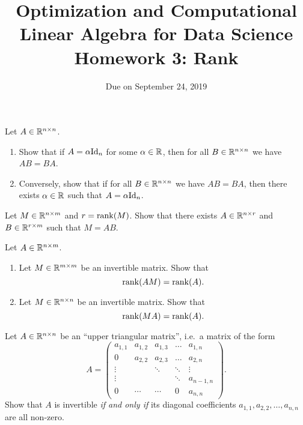 \documentclass[11pt,nocut]{article}
\title{\vspace{-2.0cm}%
	Optimization and Computational Linear Algebra for Data Science\\
Homework 3: Rank}
\date{\vspace{-1cm}Due on September 24, 2019}
\begin{document}
\maketitle



\begin{problem}[2 points]
	Let $A \in \mathbb{R}^{n \times n}$.
	\begin{enumerate}[label=\normalfont(\textbf{\alph*})]
		\item Show that if $A = \alpha {{\rm Id}}_n$ for some $\alpha \in \mathbb{R}$, then for all $B \in \mathbb{R}^{n \times n}$ we have $A B = B A$.
		\item Conversely, show that if for all $B \in \mathbb{R}^{n \times n}$ we have $AB = BA$, then there exists $\alpha \in \mathbb{R}$ such that $A = \alpha {{\rm Id}}_n$.
	\end{enumerate}
\end{problem}

\vspace{1mm}

\begin{problem}[2 points]
	Let $M \in \mathbb{R}^{n \times m}$ and $r = {{\rm rank}}(M)$. Show that there exists $A \in \mathbb{R}^{n \times r}$ and $B \in \mathbb{R}^{r \times m}$ such that $M = AB$.
\end{problem}

\vspace{1mm}

\begin{problem}[3 points]
Let $A \in \mathbb{R}^{n \times m}$. 
	\begin{enumerate}[label=\normalfont(\textbf{\alph*})]
		\item Let $M \in \mathbb{R}^{m \times m}$ be an invertible matrix.
			Show that
			$$
			{{\rm rank}}(AM) = {{\rm rank}}(A).
			$$
		\item Let $M \in \mathbb{R}^{n \times n}$ be an invertible matrix.
			Show that
			$$
			{{\rm rank}}(MA) = {{\rm rank}}(A).
			$$
\end{enumerate}
\end{problem}

\vspace{1mm}

\begin{problem}[3 points]
	Let $A \in \mathbb{R}^{n \times n}$ be an ``upper triangular matrix'', i.e.\ a matrix of the form
	$$
	A=
	\begin{pmatrix}
		a_{1,1}&a_{1,2}&a_{1,3}&\ldots& a_{1,n}\\
		0 & a_{2,2}&a_{2,3}&\ldots& a_{2,n}\\
			   \vdots & &\ddots &\ddots &\vdots \\
			   \vdots & & & \ddots & a_{n-1,n}\\
		0& \cdots& \cdots & 0 &a_{n,n}
	\end{pmatrix}.
	$$
	Show that $A$ is invertible \emph{if and only if} its diagonal coefficients $a_{1,1}, a_{2,2}, \dots, a_{n,n}$ are all non-zero.
\end{problem}
\end{document}
